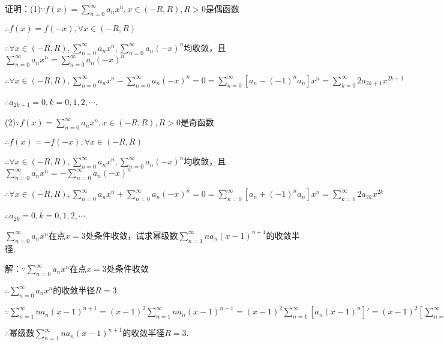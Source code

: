 \documentclass[12pt,UTF8]{ctexart}
\newcommand\Ser[1]{\sum_{n=#1}^\infty}
\begin{document}
\begin{enumerate}
证明：(1)$\because f(x)=\Ser{0}a_nx^n,x\in(-R,R),R>0$是偶函数

$\therefore f(x)=f(-x),\forall x\in(-R,R)$

$\therefore\forall x\in(-R,R),\Ser{0}a_nx^n,\Ser{0}a_n(-x)^n$均收敛，且$\Ser{0}a_nx^n=\Ser{0}a_n(-x)^n$

$\therefore\forall x\in(-R,R),\Ser{0}a_nx^n-\Ser{0}a_n(-x)^n=0=\Ser{0}[a_n-(-1)^na_n]x^n=\sum_{k=0}^\infty2a_{2k+1}x^{2k+1}$

$\therefore a_{2k+1}=0,k=0,1,2,\cdots$.

(2)$\because f(x)=\Ser{0}a_nx^n,x\in(-R,R),R>0$是奇函数

$\therefore f(x)=-f(-x),\forall x\in(-R,R)$

$\therefore\forall x\in(-R,R),\Ser{0}a_nx^n,\Ser{0}a_n(-x)^n$均收敛，且$\Ser{0}a_nx^n=-\Ser{0}a_n(-x)^n$

$\therefore\forall x\in(-R,R),\Ser{0}a_nx^n+\Ser{0}a_n(-x)^n=0=\Ser{0}[a_n+(-1)^na_n]x^n=\sum_{k=0}^\infty2a_{2k}x^{2k}$

$\therefore a_{2k}=0,k=0,1,2,\cdots$.

$\Ser{0}a_nx^n$在点$x=3$处条件收敛，试求幂级数$\Ser{1}na_n(x-1)^{n+1}$的收敛半径.

解：$\because\Ser{0}a_nx^n$在点$x=3$处条件收敛

$\therefore\Ser{0}a_nx^n$的收敛半径$R=3$

$\because\Ser{1}na_n(x-1)^{n+1}=(x-1)^2\Ser{1}na_n(x-1)^{n-1}=(x-1)^2\Ser{1}[a_n(x-1)^n]'=(x-1)^2[\Ser{1}a_n(x-1)^n]'=(x-1)^2[\Ser{0}a_n(x-1)^n-a_0]'$

$\therefore$幂级数$\Ser{1}na_n(x-1)^{n+1}$的收敛半径$R=3$.
\end{enumerate}
\end{document}
